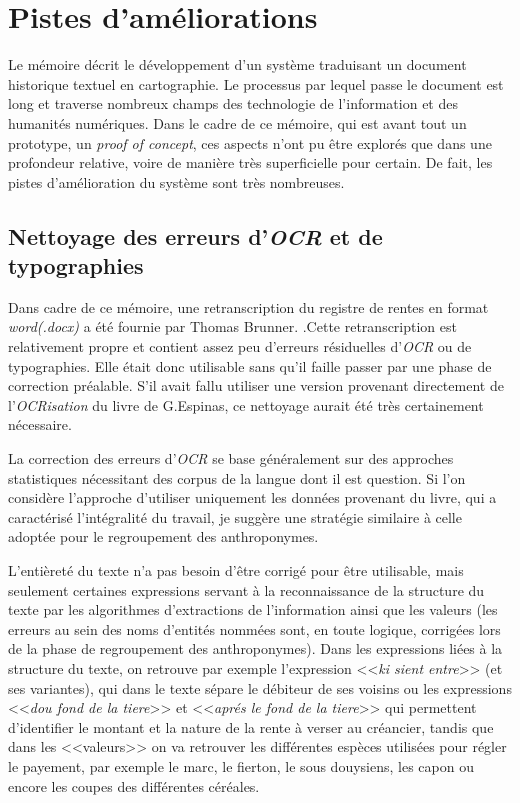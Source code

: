 \section{Pistes d'améliorations}
Le mémoire décrit le développement d'un système traduisant un document historique textuel en cartographie. Le processus par lequel passe le document est long  et traverse nombreux champs des technologie de l'information et des humanités numériques. Dans le cadre de ce  mémoire, qui est avant tout un prototype, un \textit{proof of concept}, ces aspects n'ont pu être explorés que dans une profondeur relative, voire de manière très superficielle pour certain. De fait, les pistes d'amélioration du système sont très nombreuses.

\subsection{Nettoyage des erreurs d'\textit{OCR} et de typographies}
Dans cadre de ce mémoire, une retranscription du registre de rentes en format  \textit{word(.docx)} a été fournie par Thomas Brunner.
.Cette retranscription est relativement propre et contient assez peu d'erreurs résiduelles d'\textit{OCR} ou de typographies. Elle était donc utilisable sans qu'il faille passer par une phase de correction préalable. S'il avait fallu utiliser une version provenant directement de l'\textit{OCRisation} du livre de G.Espinas, ce nettoyage aurait été très certainement nécessaire. 

La correction des erreurs d'\textit{OCR} se base généralement sur des approches statistiques nécessitant des corpus de la langue dont il est question. Si l'on considère l'approche d'utiliser uniquement les données provenant du livre, qui a caractérisé l'intégralité du travail, je suggère une stratégie similaire à celle adoptée pour le regroupement des anthroponymes.

L'entièreté du texte n'a pas besoin d'être corrigé pour être utilisable, mais seulement certaines expressions servant à la reconnaissance de la structure du texte par les algorithmes d'extractions de l'information ainsi que les valeurs (les erreurs au sein des noms d'entités nommées sont, en toute logique, corrigées lors de la phase de regroupement des anthroponymes). Dans les expressions liées à la structure du texte, on retrouve par exemple l'expression <<\textit{ki sient entre}>> (et ses variantes), qui dans le texte sépare le débiteur de ses voisins ou  les expressions <<\textit{dou fond de la tiere}>> et <<\textit{aprés le fond de la tiere}>>  qui permettent d'identifier le montant et la nature de la rente à verser au créancier, tandis que dans les <<valeurs>> on va retrouver les différentes espèces utilisées pour régler le payement, par exemple le marc, le fierton, le sous douysiens, les capon ou encore les coupes des différentes céréales.

